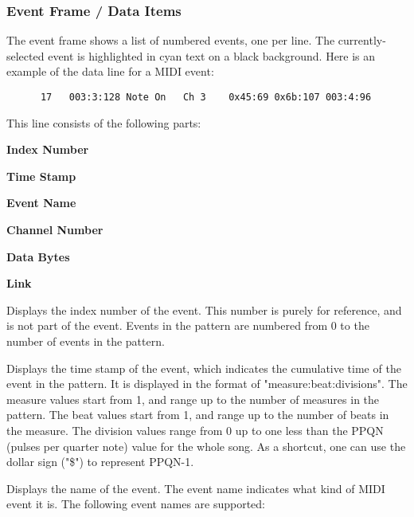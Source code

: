 \subsubsection{Event Frame / Data Items}
\label{subsec:event_frame_data}

   The event frame shows a list of numbered events, one per line.
   The currently-selected event is highlighted in cyan text on a black
   background.  Here is an example of the data line for a MIDI event:

   \begin{verbatim}
      17   003:3:128 Note On   Ch 3    0x45:69 0x6b:107 003:4:96
   \end{verbatim}

   This line consists of the following parts:

   \begin{enumber}
      \item \textbf{Index Number}
      \item \textbf{Time Stamp}
      \item \textbf{Event Name}
      \item \textbf{Channel Number}
      \item \textbf{Data Bytes}
      \item \textbf{Link}
   \end{enumber}

   \setcounter{ItemCounter}{0}      %

   Displays the index number of the event.
   This number is purely for reference, and is not part
   of the event.  Events in the pattern are numbered from 0 to the number of
   events in the pattern.

   Displays the time stamp of the event,
   which indicates the cumulative time of the event in the pattern.
   It is displayed in the format of "measure:beat:divisions".
   The measure values start from 1, and range up to the number of measures in
   the pattern.
   The beat values start from 1, and range up to the number of beats in the
   measure.
   The division values range from 0 up to one less than the
   PPQN (pulses per quarter note) value for the whole song.
   As a shortcut, one can use the dollar sign ("\$") to represent
   PPQN-1.

   Displays the name of the event.
   The event name indicates what kind of MIDI event it is. 
   The following event names are supported:

